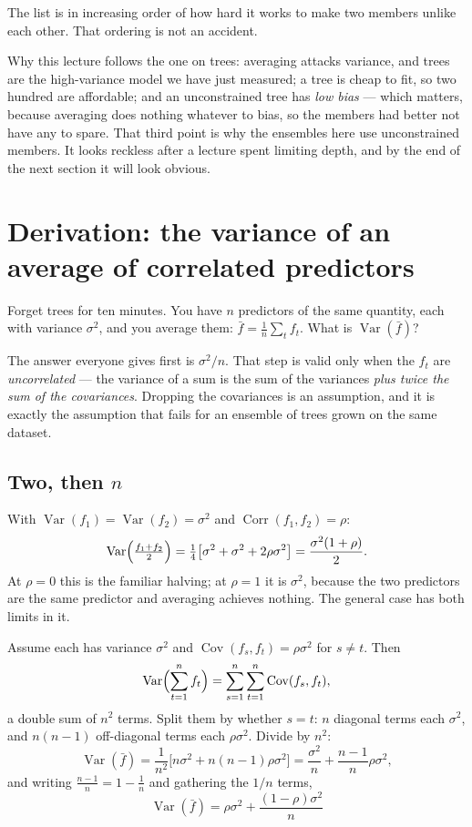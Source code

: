 \documentclass[11pt,a4paper]{article}
\begin{document}
The list is in increasing order of how hard it works to make two members unlike
each other. That ordering is not an accident.

Why this lecture follows the one on trees: averaging attacks variance, and
trees are the high-variance model we have just measured; a tree is cheap to
fit, so two hundred are affordable; and an unconstrained tree has \emph{low
bias} --- which matters, because averaging does nothing whatever to bias, so
the members had better not have any to spare. That third point is why the
ensembles here use unconstrained members. It looks reckless after a lecture
spent limiting depth, and by the end of the next section it will look obvious.

\section{Derivation: the variance of an average of correlated predictors}

Forget trees for ten minutes. You have $n$ predictors of the same quantity,
each with variance $\sigma^2$, and you average them:
$\bar f = \frac{1}{n}\sum_t f_t$. What is $\operatorname{Var}(\bar f)$?

The answer everyone gives first is $\sigma^2/n$. That step is valid only when
the $f_t$ are \emph{uncorrelated} --- the variance of a sum is the sum of the
variances \emph{plus twice the sum of the covariances}. Dropping the
covariances is an assumption, and it is exactly the assumption that fails for
an ensemble of trees grown on the same dataset.

\subsection{Two, then $n$}

With $\operatorname{Var}(f_1) = \operatorname{Var}(f_2) = \sigma^2$ and
$\operatorname{Corr}(f_1,f_2) = \rho$:
\[ \operatorname{Var}\Bigl(\tfrac{f_1+f_2}{2}\Bigr)
   = \tfrac14\bigl[\sigma^2 + \sigma^2 + 2\rho\sigma^2\bigr]
   = \frac{\sigma^2(1+\rho)}{2}. \]
At $\rho = 0$ this is the familiar halving; at $\rho = 1$ it is $\sigma^2$,
because the two predictors are the same predictor and averaging achieves
nothing. The general case has both limits in it.

\begin{derivbox}[title={$n$ identically distributed predictors, common pairwise $\rho$}]
Assume each has variance $\sigma^2$ and
$\operatorname{Cov}(f_s, f_t) = \rho\sigma^2$ for $s \ne t$. Then
\[ \operatorname{Var}\Bigl(\sum_{t=1}^{n} f_t\Bigr)
   = \sum_{s=1}^{n}\sum_{t=1}^{n}\operatorname{Cov}(f_s, f_t), \]
a double sum of $n^2$ terms. Split them by whether $s = t$: $n$ diagonal terms
each $\sigma^2$, and $n(n-1)$ off-diagonal terms each $\rho\sigma^2$. Divide by
$n^2$:
\[ \operatorname{Var}(\bar f)
   = \frac{1}{n^2}\bigl[n\sigma^2 + n(n-1)\rho\sigma^2\bigr]
   = \frac{\sigma^2}{n} + \frac{n-1}{n}\rho\sigma^2, \]
and writing $\frac{n-1}{n} = 1 - \frac1n$ and gathering the $1/n$ terms,
\[ \boxed{\;\operatorname{Var}(\bar f)
   = \rho\sigma^2 + \frac{(1-\rho)\sigma^2}{n}\;} \]
\end{derivbox}
\end{document}
